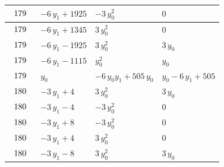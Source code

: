 \begin{table}[H]
\begin{center}
{\begin{tabular}{|l|l|l|l|}
$\begin{tabular}{l}
179 \\
\end{tabular}$ & $ -6 \, y_{1} + 1925 $ & $ -3 \, y_{0}^{2} $ & $ 0 $ \\ \hline
$\begin{tabular}{l}
179 \\
\end{tabular}$ & $ -6 \, y_{1} + 1345 $ & $ 3 \, y_{0}^{2} $ & $ 0 $ \\ \hline
$\begin{tabular}{l}
179 \\
\end{tabular}$ & $ -6 \, y_{1} - 1925 $ & $ 3 \, y_{0}^{2} $ & $ 3 \, y_{0} $ \\ \hline
$\begin{tabular}{l}
179 \\
\end{tabular}$ & $ -6 \, y_{1} - 1115 $ & $ y_{0}^{2} $ & $ y_{0} $ \\ \hline
$\begin{tabular}{l}
179 \\
\end{tabular}$ & $ y_{0} $ & $ -6 \, y_{0} y_{1} + 505 \, y_{0} $ & $ y_{0} - 6 \, y_{1} + 505 $ \\ \hline
$\begin{tabular}{l}
180 \\
\end{tabular}$ & $ -3 \, y_{1} + 4 $ & $ 3 \, y_{0}^{2} $ & $ 3 \, y_{0} $ \\ \hline
$\begin{tabular}{l}
180 \\
\end{tabular}$ & $ -3 \, y_{1} - 4 $ & $ -3 \, y_{0}^{2} $ & $ 0 $ \\ \hline
$\begin{tabular}{l}
180 \\
\end{tabular}$ & $ -3 \, y_{1} + 8 $ & $ -3 \, y_{0}^{2} $ & $ 0 $ \\ \hline
$\begin{tabular}{l}
180 \\
\end{tabular}$ & $ -3 \, y_{1} + 4 $ & $ 3 \, y_{0}^{2} $ & $ 0 $ \\ \hline
$\begin{tabular}{l}
180 \\
\end{tabular}$ & $ -3 \, y_{1} - 8 $ & $ 3 \, y_{0}^{2} $ & $ 3 \, y_{0} $ \\ \hline

\end{tabular}}
\end{center}
\end{table}
